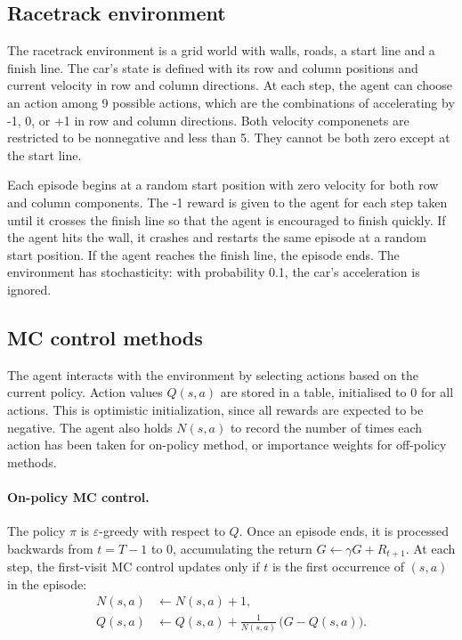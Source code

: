 \documentclass{article}
\begin{document}
\subsection{Racetrack environment}
The racetrack environment is a grid world with walls, roads, a start line and a
finish line. The car's state is defined with its row and column positions and
current velocity in row and column directions. At each step, the agent can
choose an action among 9 possible actions, which are the combinations of
accelerating by -1, 0, or +1 in row and column directions. Both velocity
componenets are restricted to be nonnegative and less than 5. They cannot be
both zero except at the start line. 

Each episode begins at a random start position with zero velocity for both row
and column components. The -1 reward is given to the agent for each step taken
until it crosses the finish line so that the agent is encouraged to finish
quickly. If the agent hits the wall, it crashes and restarts the same episode at
a random start position. If the agent reaches the finish line, the episode ends.
The environment has stochasticity: with probability 0.1, the car's acceleration
is ignored. 

\subsection{MC control methods}
The agent interacts with the environment by selecting actions based on the
current policy. Action values $Q(s,a)$ are stored in a table, initialised to $0$
for all actions. This is optimistic initialization, since all rewards are
expected to be negative. The agent also holds $N(s,a)$ to record the number of
times each action has been taken for on-policy method, or importance weights for
off-policy methods. 

\paragraph{On-policy MC control.}
The policy $\pi$ is $\varepsilon$-greedy with respect to $Q$. Once an episode
ends, it is processed backwards from $t=T-1$ to $0$, accumulating the return
$G\leftarrow \gamma G + R_{t+1}$. At each step, the first-visit MC control
updates only if $t$ is the first occurrence of $(s,a)$ in the episode:
\begin{align*}
    N(s,a) &\leftarrow N(s,a) + 1,\\
    Q(s,a) &\leftarrow Q(s,a)+\frac{1}{N(s,a)}\,\bigl(G-Q(s,a)\bigr).
\end{align*}
\end{document}
